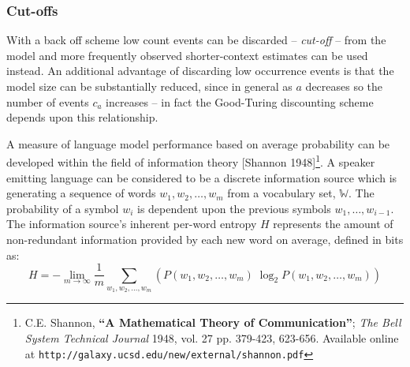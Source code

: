 
\subsubsection{Cut-offs}
With a back off scheme low count events
can be discarded -- {\it cut-off} -- from the model and more frequently observed
shorter-context estimates can be used instead. An additional advantage
of discarding low occurrence events is that the model size can be
substantially reduced, since in general as $a$ decreases so the number
of events $c_a$ increases -- in fact the Good-Turing discounting
scheme depends upon this relationship.


A measure of language model performance based on average probability
can be developed within the field of information theory
[Shannon 1948]\footnote{C.E. Shannon, \textbf{``A Mathematical
Theory of Communication''}; \textit{The Bell System Technical Journal}
1948, vol. 27 pp. 379-423, 623-656. Available online at
\texttt{http://galaxy.ucsd.edu/new/external/shannon.pdf}}.
A speaker emitting language can be considered to be a discrete
information source which is generating a sequence of words $w_1, w_2,
\ldots, w_m$ from a vocabulary set, $\mathbb{W}$. The probability of a
symbol $w_i$ is dependent upon the previous symbols $w_1, \ldots,
w_{i-1}$. The information source's inherent per-word entropy $H$
represents the amount of non-redundant information provided by each
new word on average, defined in bits as:
\begin{equation}
H = - \lim_{m \to \infty} \frac{1}{m} \sum_{w_1, w_2, \ldots, w_m}\left( P(w_1, w_2, \ldots, w_m)\;
\log_2 P(w_1, w_2, \ldots, w_m) \right)
\end{equation}

